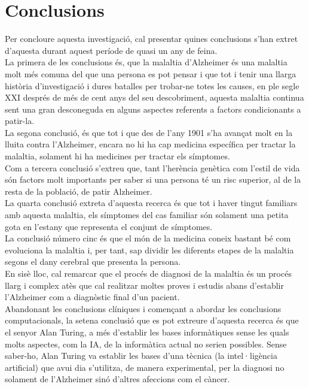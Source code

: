 \documentclass[a4paper,12pt]{report}
\begin{document}
\chapter*{Conclusions}
Per concloure aquesta investigació, cal presentar quines conclusions s'han extret d'aquesta durant aquest període de quasi un any de feina.\\
La primera de les conclusions és, que la malaltia d'Alzheimer és una malaltia molt més comuna del que una persona es pot pensar i que tot i tenir una llarga història d'investigació i dures batalles per trobar-ne totes les causes, en ple segle XXI després de més de cent anys del seu descobriment, aquesta malaltia continua sent una gran desconeguda en alguns aspectes referents a factors condicionants a patir-la.\\
La segona conclusió, és que tot i que des de l'any 1901 s'ha avançat molt en la lluita contra l'Alzheimer, encara no hi ha cap medicina específica per tractar la malaltia, solament hi ha medicines per tractar els símptomes.\\
Com a tercera conclusió s'extreu que, tant l'herència genètica com l'estil de vida són factors molt importants per saber si una persona té un risc superior, al de la resta de la població, de patir Alzheimer.\\ 
La quarta conclusió extreta d'aquesta recerca és que tot i haver tingut familiars amb aquesta malaltia, els símptomes del cas familiar són solament una petita gota en l'estany que representa el conjunt de símptomes.\\
La conclusió número cinc és que el món de la medicina coneix bastant bé com evoluciona la malaltia i, per tant, sap dividir les diferents etapes de la malaltia segons el dany cerebral que presenta la persona.\\
En sisè lloc, cal remarcar que el procés de diagnosi de la malaltia és un procés llarg i complex atès que cal realitzar moltes proves i estudis abans d'establir l'Alzheimer com a diagnòstic final d'un pacient.\\
Abandonant les conclusions clíniques i començant a abordar les conclusions computacionals, la setena conclusió que es pot extreure d'aquesta recerca és que el senyor Alan Turing, a més d'establir les bases informàtiques sense les quals molts aspectes, com la IA, de la informàtica actual no serien possibles. Sense saber-ho, Alan Turing va establir les bases d'una tècnica (la intel·ligència artificial) que avui dia s'utilitza, de manera experimental, per la diagnosi no solament de l'Alzheimer sinó d'altres afeccions com el càncer.\\
\end{document}
